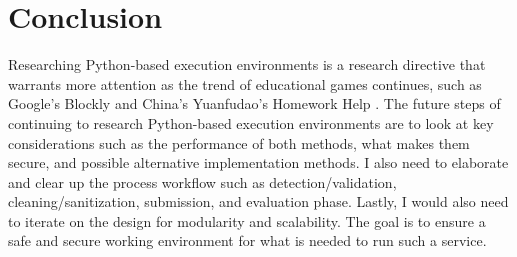 \section{Conclusion}
Researching Python-based execution environments is a research directive that warrants more attention as the trend of educational games continues, such as Google’s Blockly \cite{google_blockly} and China’s Yuanfudao's Homework Help \cite{xiaoyuan_kousuan}.
The future steps of continuing to research Python-based execution environments are to look at key considerations such as the performance of both methods, what makes them secure, and possible alternative implementation methods. I also need to elaborate and clear up the process workflow such as detection/validation, cleaning/sanitization, submission, and evaluation phase. Lastly, I would also need to iterate on the design for modularity and scalability. The goal is to ensure a safe and secure working environment for what is needed to run such a service.